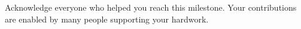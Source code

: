 \documentclass[12pt,oneside]{book}
\numberwithin{equation}{section}
\theoremstyle{plain}
\theoremstyle{definition}
\theoremstyle{remark}
\begin{document}
\newpage

\chapter*{}
\begin{doublespace}	
	
Acknowledge everyone who helped you reach this milestone. Your contributions are enabled by many people supporting your hardwork.  
	
\end{doublespace}

\newpage


\tableofcontents

 
\clearpage %
\listoffigures

\clearpage %
\listoftables
 \clearpage %



\mainmatter
\fontsize{11}{20pt} \selectfont  
\begin{doublespacing}








\end{doublespacing}
\end{document}
